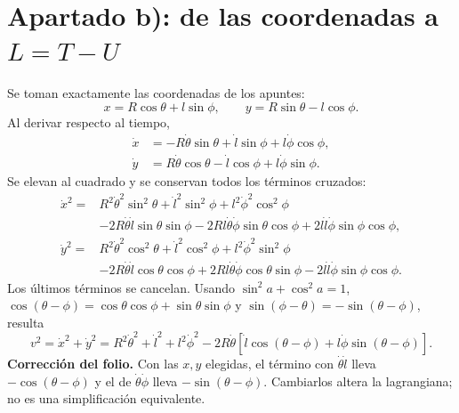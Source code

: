 \documentclass[11pt,a4paper]{article}
\begin{document}

\section{Apartado b): de las coordenadas a \texorpdfstring{$L=T-U$}{L=T-U}}
Se toman exactamente las coordenadas de los apuntes:
\begin{equation}
 x=R\cos\theta+l\sin\phi,\qquad y=R\sin\theta-l\cos\phi.
\end{equation}
Al derivar respecto al tiempo,
\begin{align}
 \dot x&=-R\dot\theta\sin\theta+\dot l\sin\phi+l\dot\phi\cos\phi,\\
 \dot y&=R\dot\theta\cos\theta-\dot l\cos\phi+l\dot\phi\sin\phi.
\end{align}
Se elevan al cuadrado y se conservan todos los términos cruzados:
\begin{align}
 \dot x^2={}&R^2\dot\theta^2\sin^2\theta+\dot l^2\sin^2\phi+l^2\dot\phi^2\cos^2\phi\nonumber\\
 &-2R\dot\theta\dot l\sin\theta\sin\phi
 -2Rl\dot\theta\dot\phi\sin\theta\cos\phi
 +2l\dot l\dot\phi\sin\phi\cos\phi,\\
 \dot y^2={}&R^2\dot\theta^2\cos^2\theta+\dot l^2\cos^2\phi+l^2\dot\phi^2\sin^2\phi\nonumber\\
 &-2R\dot\theta\dot l\cos\theta\cos\phi
 +2Rl\dot\theta\dot\phi\cos\theta\sin\phi
 -2l\dot l\dot\phi\sin\phi\cos\phi.
\end{align}
Los últimos términos se cancelan. Usando $\sin^2 a+\cos^2a=1$, $\cos(\theta-\phi)=\cos\theta\cos\phi+\sin\theta\sin\phi$ y $\sin(\phi-\theta)=-\sin(\theta-\phi)$, resulta
\begin{equation}
 v^2=\dot x^2+\dot y^2=R^2\dot\theta^2+\dot l^2+l^2\dot\phi^2
 -2R\dot\theta[\dot l\cos(\theta-\phi)+l\dot\phi\sin(\theta-\phi)].
\end{equation}
\textbf{Corrección del folio.} Con las $x,y$ elegidas, el término con $\dot\theta\dot l$ lleva $-\cos(\theta-\phi)$ y el de $\dot\theta\dot\phi$ lleva $-\sin(\theta-\phi)$. Cambiarlos altera la lagrangiana; no es una simplificación equivalente.
\end{document}

